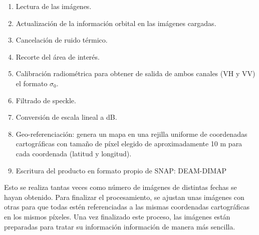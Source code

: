 \begin{enumerate}
	\item Lectura de las imágenes.
	\item Actualización de la información orbital en las imágenes cargadas.
	\item Cancelación de ruido térmico.
	\item Recorte del área de interés.
	\item Calibración radiométrica para obtener de salida de ambos canales (VH y VV) el formato $\sigma_{0}$.
	\item Filtrado de speckle.
	\item Conversión de escala lineal a dB.
	\item Geo-referenciación: genera un mapa en una rejilla uniforme de
coordenadas cartográficas con tamaño de píxel elegido de aproximadamente 10 m para cada coordenada (latitud y longitud).
	\item Escritura del producto en formato propio de SNAP: DEAM-DIMAP 
\end{enumerate}
\par Esto se realiza tantas veces como número de imágenes de distintas fechas se hayan obtenido. Para finalizar el procesamiento, se ajustan unas imágenes con otras para que todas estén referenciadas a las mismas coordenadas cartográficas en los mismos píxeles. Una vez finalizado este proceso, las imágenes están preparadas para tratar su información información de manera más sencilla.  

